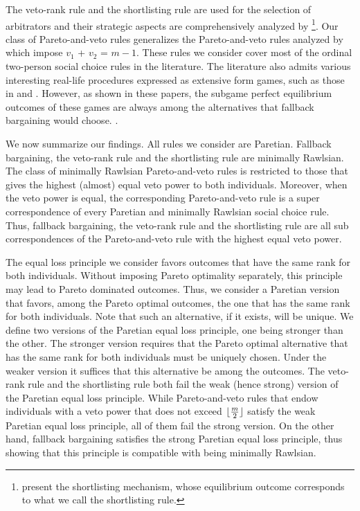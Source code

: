 \documentclass[version=3.21, pagesize, twoside=off, bibliography=totoc, DIV=calc, fontsize=12pt, a4paper]{scrartcl}
\begin{document}
The veto-rank rule and the shortlisting rule are used for the selection of arbitrators and their strategic aspects are comprehensively analyzed by \citet{Clippel}%
\footnote{ present the shortlisting mechanism, whose equilibrium outcome corresponds to what we call the shortlisting rule.}. Our class of Pareto-and-veto rules generalizes the Pareto-and-veto rules analyzed by \citet{laslier2021solution} which impose $v_1$ + $v_2$ = $m-1$. These rules we consider cover most of the ordinal two-person social choice rules in the literature. The literature also admits various interesting real-life procedures expressed as extensive form games, such as those in \citet{anbarci1993noncooperative, anbarci2006finite} and \citet{barbera2022compromising}. However, as shown in these papers, the subgame perfect equilibrium outcomes of these games are always among the alternatives that fallback bargaining would choose.  .

We now summarize our findings. All rules we consider are Paretian. Fallback bargaining, the veto-rank rule and the shortlisting rule are minimally Rawlsian. The class of minimally Rawlsian Pareto-and-veto rules is restricted to those that gives the highest (almost) equal veto power to both individuals. Moreover, when the veto power is equal, the corresponding Pareto-and-veto rule is a super correspondence of every Paretian and minimally Rawlsian social choice rule. Thus, fallback bargaining, the veto-rank rule and the shortlisting rule are all sub correspondences of the Pareto-and-veto rule with the highest equal veto power.

The equal loss principle we consider favors outcomes that have the same rank for both individuals. Without imposing Pareto optimality separately, this principle may lead to Pareto dominated outcomes. Thus, we consider a Paretian version that favors, among the Pareto optimal outcomes, the one that has the same rank for both individuals. Note that such an alternative, if it exists, will be unique. We define two versions of the Paretian equal loss principle, one being stronger than the other. The stronger version requires that the Pareto optimal alternative that has the same rank for both individuals must be uniquely chosen. Under the weaker version it suffices that this alternative be among the outcomes. The veto-rank rule and the shortlisting rule both fail the weak (hence strong) version of the Paretian equal loss principle. While Pareto-and-veto rules that endow individuals with a veto power that does not exceed $\lfloor\frac{m}{2}\rfloor$ satisfy the weak Paretian equal loss principle, all of them fail the strong version. On the other hand, fallback bargaining satisfies the strong Paretian equal loss principle, thus showing that this principle is compatible with being minimally Rawlsian.
 
\end{document}
